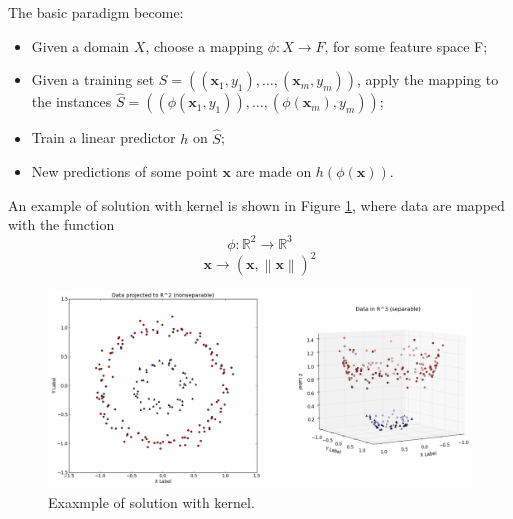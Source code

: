The basic paradigm become:
\begin{itemize}
	\item Given a domain $X$, choose a mapping $\phi : X \rightarrow F$, for some feature space F;
	\item Given a training set $S = ((\mathbf{x}_1, y_1), \dots , (\mathbf{x}_m, y_m))$, apply the mapping to the instances $\hat{S} = ((\phi(\mathbf{x}_1, y_1)), \dots , (\phi(\mathbf{x}_m), y_m))$;
	\item Train a linear predictor $h$ on $\hat{S}$;
	\item New predictions of some point $\mathbf{x}$ are made on $h(\phi (\mathbf{x}))$.
\end{itemize}

An example of solution with kernel is shown in Figure \ref{fig:kernel-3d}, where data are mapped with the function 
\[ \phi : \mathbb{R}^2 \rightarrow \mathbb{R}^3 \]
\[ \mathbf{x} \rightarrow (\mathbf{x}, \left\lVert \mathbf{x} \right\rVert)^2 \]

\begin{figure}[ht]
	\centering
	\includegraphics[width=1\textwidth]{figures/kernel-3d.png}
	\caption{Exaxmple of solution with kernel.}
	\label{fig:kernel-3d}
\end{figure}


